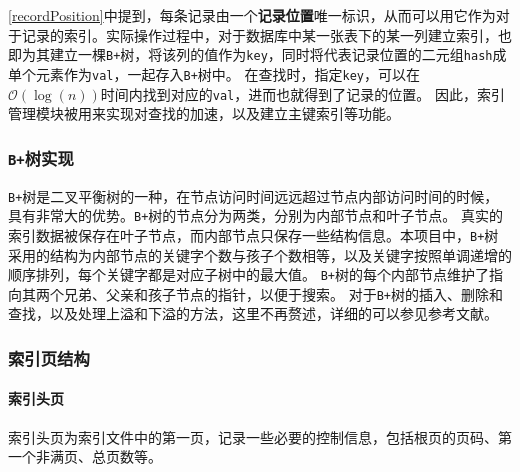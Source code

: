 \documentclass[11pt]{article}
\begin{document}
\ref{recordPosition}中提到，每条记录由一个\textbf{记录位置}唯一标识，从而可以用它作为对于记录的索引。实际操作过程中，对于数据库中某一张表下的某一列建立索引，也即为其建立一棵\texttt{B+}树，将该列的值作为\texttt{key}，同时将代表记录位置的二元组\texttt{hash}成单个元素作为\texttt{val}，一起存入\texttt{B+}树中。
在查找时，指定\texttt{key}，可以在$\mathcal{O}(\log(n))$时间内找到对应的\texttt{val}，进而也就得到了记录的位置。
因此，索引管理模块被用来实现对查找的加速，以及建立主键索引等功能。\\
\subsubsection{\texttt{B+}树实现}
\texttt{B+}树是二叉平衡树的一种，在节点访问时间远远超过节点内部访问时间的时候，具有非常大的优势。\texttt{B+}树的节点分为两类，分别为内部节点和叶子节点。
真实的索引数据被保存在叶子节点，而内部节点只保存一些结构信息。本项目中，\texttt{B+}树采用的结构为内部节点的关键字个数与孩子个数相等，以及关键字按照单调递增的顺序排列，每个关键字都是对应子树中的最大值。
\texttt{B+}树的每个内部节点维护了指向其两个兄弟、父亲和孩子节点的指针，以便于搜索。
对于\texttt{B+}树的插入、删除和查找，以及处理上溢和下溢的方法，这里不再赘述，详细的可以参见参考文献。
\subsubsection{索引页结构}
\paragraph{索引头页} 索引头页为索引文件中的第一页，记录一些必要的控制信息，包括根页的页码、第一个非满页、总页数等。
\end{document}
